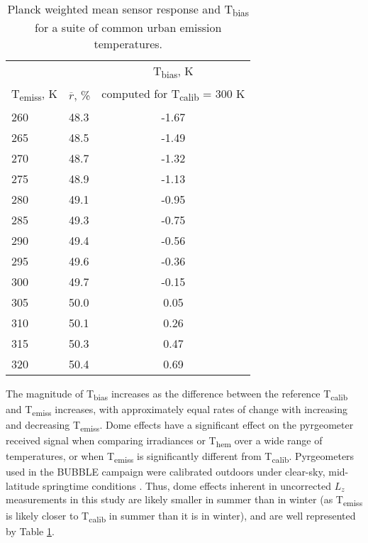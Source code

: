 \begin{bibunit}
\begin{table}[H]
	\centering
	\caption{Planck weighted mean sensor response and T\textsubscript{bias} for a suite of common urban emission temperatures.}
	\label{nonuniformsen}
	\begin{tabular}{p{1.5cm}p{1.5cm}c}
		\toprule 
		& & T\textsubscript{bias}, \si{\kelvin} \\
		T\textsubscript{emiss}, \si{\kelvin}& $\overline{r}$, \% & computed for T\textsubscript{calib} = 300 \si{\kelvin} \\ \midrule
		260 & 48.3 & -1.67 \\ 
		265 & 48.5 & -1.49 \\ 
		270 & 48.7 & -1.32 \\ 
		275 & 48.9 & -1.13 \\ 
		280 & 49.1 & -0.95 \\ 
		285 & 49.3 & -0.75 \\ 
		290 & 49.4 & -0.56 \\ 
		295 & 49.6 & -0.36 \\ 
		300 & 49.7 & -0.15 \\ 
		305 & 50.0 & 0.05 \\ 
		310 & 50.1 & 0.26  \\ 
		315 & 50.3 & 0.47 \\ 
		320 & 50.4 & 0.69  \\
		\bottomrule
	\end{tabular} 
\end{table}

The magnitude of T\textsubscript{bias} increases as the difference between the reference T\textsubscript{calib} and T\textsubscript{emiss} increases, with approximately equal rates of change with increasing and decreasing T\textsubscript{emiss}. Dome effects have a significant effect on the pyrgeometer received signal when comparing irradiances or T\textsubscript{hem} over a wide range of temperatures, or when T\textsubscript{emiss} is significantly different from T\textsubscript{calib}. Pyrgeometers used in the BUBBLE campaign were calibrated outdoors under clear-sky, mid-latitude springtime conditions \citep{Christen2005}. Thus, dome effects inherent in uncorrected $L_z$ measurements in this study are likely smaller in summer than in winter (as T\textsubscript{emiss} is likely closer to T\textsubscript{calib} in summer than it is in winter), and are well represented by Table \ref{nonuniformsen}.


\end{bibunit}
